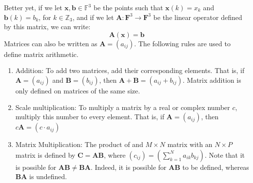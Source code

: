     Better yet, if we let $\mathbf{x},\mathbf{b}\in\mathbb{F}^{3}$ be the points
    such that $\mathbf{x}(k)=x_{k}$ and $\mathbf{b}(k)=b_{k}$, for
    $k\in\mathbb{Z}_{3}$, and if we let
    $\mathbf{A}:\mathbf{F}^{3}\rightarrow\mathbf{F}^{3}$ be the linear operator
    defined by this matrix, we can write:
    \begin{equation}
        \mathbf{A}(\mathbf{x})=\mathbf{b}
    \end{equation}
    Matrices can also be written as $\mathbf{A}=(a_{ij})$. The following rules
    are used to define matrix arithmetic.
    \begin{enumerate}
        \item Addition: To add two matrices, add their
            corresponding elements. That is, if
            $\mathbf{A}=(a_{ij})$ and $\mathbf{B}=(b_{ij})$,
            then $\mathbf{A}+\mathbf{B}=(a_{ij}+b_{ij})$.
            Matrix addition is only defined on matrices of
            the same size.
        \item Scale multiplication: To multiply a
            matrix by a real or complex number $c$,
            multiply this number to every element. That is,
            if $\mathbf{A}=(a_{ij})$, then
            $c\mathbf{A}=({c}\cdot{a_{ij}})$
        \item Matrix Multiplication: The product of
            and ${M}\times{N}$ matrix with an
            ${N}\times{P}$ matrix is defined by
            $\mathbf{C}=\mathbf{A}\mathbf{B}$, where
            $(c_{ij})=(\sum_{k=1}^{N}a_{ik}b_{kj})$. Note
            that it is possible for
            $\mathbf{A}\mathbf{B}\ne\mathbf{B}\mathbf{A}$.
            Indeed, it is possible for
            $\mathbf{A}\mathbf{B}$ to be defined, whereas
            $\mathbf{B}\mathbf{A}$ is undefined.
    \end{enumerate}

